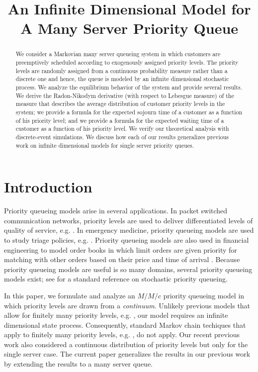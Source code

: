 \documentclass[conference]{IEEEtran}
\title{An Infinite Dimensional Model for\\ A Many Server Priority Queue}
\author{ %
  \IEEEauthorblockN{Neal Master, Zhengyuan Zhou, and Nicholas Bambos}%
  \IEEEauthorblockA{Department of Electrical Engineering, Stanford University\\
    Stanford, CA 94305\\
    \texttt{\{nmaster, zyzhou, bambos\}@stanford.edu}} }
\begin{document}
\maketitle
\thispagestyle{empty}
\pagestyle{empty}

\begin{abstract}
  We consider a Markovian many server queueing system in which
  customers are preemptively scheduled according to exogenously
  assigned priority levels. The priority levels are randomly assigned
  from a continuous probability measure rather than a discrete one and
  hence, the queue is modeled by an infinite dimensional stochastic
  process. We analyze the equilibrium behavior of the system and
  provide several results. We derive the Radon-Nikodym derivative
  (with respect to Lebesgue measure) of the measure that describes the
  average distribution of customer priority levels in the system; we
  provide a formula for the expected sojourn time of a customer as a
  function of his priority level; and we provide a formula for the
  expected waiting time of a customer as a function of his priority
  level. We verify our theoretical analysis with discrete-event
  simulations. We discuss how each of our results generalizes previous
  work on infinite dimensional models for single server priority
  queues.
\end{abstract}

\section{Introduction}
Priority queueing models arise in several applications. In packet
switched communication networks, priority levels are used to deliver
differentiated levels of quality of service, e.g. \cite{Shin_2001,
  Semeria_2001}. In emergency medicine, priority queueing models are
used to study triage policies, e.g. \cite{Green_2006}. Priority
queueing models are also used in financial engineering to model order
books in which limit orders are given priority for matching with other
orders based on their price and time of arrival
\cite{Cont_2010}. Because priority queueing models are useful is so
many domains, several priority queueing models exist; see
\cite{Jaiswal_Book} for a standard reference on stochastic priority
queueing.

In this paper, we formulate and analyze an $M/M/c$ priority queueing
model in which priority levels are drawn from a
\emph{continuum}. Unlikely previous models that allow for finitely
many priority levels, e.g. \cite{Helly_1962, Burke_1962}, our model
requires an infinite dimensional state process. Consequently, standard
Markov chain techiques that apply to finitely many priority levels,
e.g. \cite{White_1958}, do not apply. Our recent previous work
\cite{Master_ACC_2017} also considered a continuous distribution of
priority levels but only for the single server case. The current paper
generalizes the results in our previous work \cite{Master_ACC_2017} by
extending the results to a many server queue.
\end{document}
